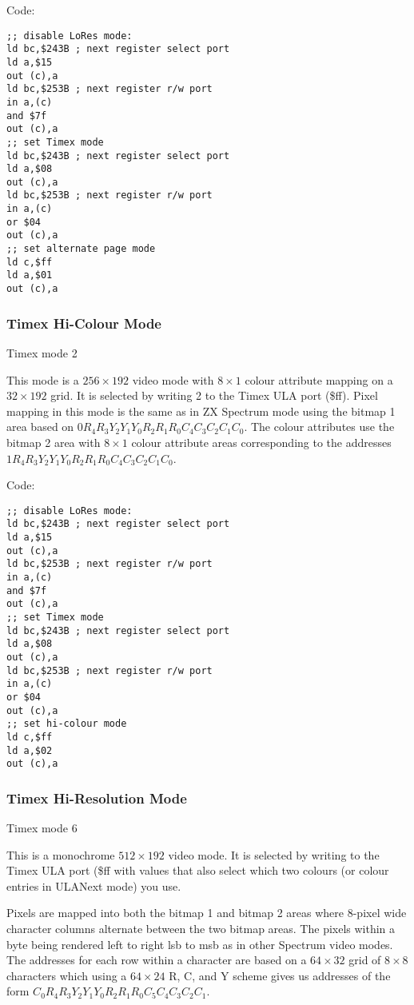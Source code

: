Code:

\begin{verbatim}
;; disable LoRes mode:
ld bc,$243B ; next register select port
ld a,$15
out (c),a
ld bc,$253B ; next register r/w port
in a,(c)
and $7f
out (c),a
;; set Timex mode
ld bc,$243B ; next register select port
ld a,$08
out (c),a
ld bc,$253B ; next register r/w port
in a,(c)
or $04
out (c),a
;; set alternate page mode
ld c,$ff
ld a,$01
out (c),a
\end{verbatim}

\subsubsection{Timex Hi-Colour Mode}

Timex mode 2

This mode is a $256\times192$ video mode with $8\times1$ colour
attribute mapping on a $32\times192$ grid. It is selected by writing 2
to the Timex ULA port (\$ff).  Pixel mapping in this mode is the same
as in ZX Spectrum mode using the bitmap 1 area based on
$0R_4R_3Y_2Y_1Y_0R_2R_1R_0C_4C_3C_2C_1C_0$.  The colour attributes use
the bitmap 2 area with $8\times1$ colour attribute areas corresponding
to the addresses $1R_4R_3Y_2Y_1Y_0R_2R_1R_0C_4C_3C_2C_1C_0$.

Code:
\begin{verbatim}
;; disable LoRes mode:
ld bc,$243B ; next register select port
ld a,$15
out (c),a
ld bc,$253B ; next register r/w port
in a,(c)
and $7f
out (c),a
;; set Timex mode
ld bc,$243B ; next register select port
ld a,$08
out (c),a
ld bc,$253B ; next register r/w port
in a,(c)
or $04
out (c),a
;; set hi-colour mode
ld c,$ff
ld a,$02
out (c),a
\end{verbatim}

\subsubsection{Timex Hi-Resolution Mode}

Timex mode 6

This is a monochrome $512\times192$ video mode. It is selected by
writing to the Timex ULA port (\$ff with values that also select which
two colours (or colour entries in ULANext mode) you use.
  
Pixels are mapped into both the bitmap 1 and bitmap 2 areas where
8-pixel wide character columns alternate between the two bitmap areas.
The pixels within a byte being rendered left to right lsb to msb as in
other Spectrum video modes.  The addresses for each row within a
character are based on a $64\times32$ grid of $8\times8$ characters
which using a $64\times24$ R, C, and Y scheme gives us addresses of
the form $C_0R_4R_3Y_2Y_1Y_0R_2R_1R_0C_5C_4C_3C_2C_1$.

